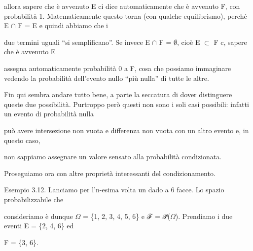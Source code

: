 \documentclass[a4paper,portrait,12pt]{article}
\begin{document}
\begin{flushleft}
allora sapere che \`{e} avvenuto E ci dice automaticamente che \`{e} avvenuto F, con probabilit\`{a} 1. Matematicamente questo torna (con qualche equilibrismo), perch\'{e} E $\cap$ F = E e quindi abbiamo che i
\end{flushleft}


\begin{flushleft}
due termini uguali {``}si semplificano''. Se invece E $\cap$ F = $\emptyset$, cio\`{e} E $\subset$ F c, sapere che \`{e} avvenuto E
\end{flushleft}


\begin{flushleft}
assegna automaticamente probabilit\`{a} 0 a F, cosa che possiamo immaginare vedendo la probabilit\`{a} dell'evento nullo {``}più nulla'' di tutte le altre.
\end{flushleft}


\begin{flushleft}
Fin qui sembra andare tutto bene, a parte la seccatura di dover distinguere queste due possibilit\`{a}. Purtroppo per\`{o} questi non sono i soli casi possibili: infatti un evento di probabilit\`{a} nulla
\end{flushleft}


\begin{flushleft}
pu\`{o} avere intersezione non vuota e differenza non vuota con un altro evento e, in questo caso,
\end{flushleft}


\begin{flushleft}
non sappiamo assegnare un valore sensato alla probabilit\`{a} condizionata.
\end{flushleft}


\begin{flushleft}
Proseguiamo ora con altre propriet\`{a} interessanti del condizionamento.
\end{flushleft}


\begin{flushleft}
Esempio 3.12. Lanciamo per l'n-esima volta un dado a 6 facce. Lo spazio probabilizzabile che
\end{flushleft}


\begin{flushleft}
consideriamo \`{e} dunque $\Omega$ = \{1, 2, 3, 4, 5, 6\} e ℱ = 𝒫($\Omega$). Prendiamo i due eventi E = \{2, 4, 6\} ed
\end{flushleft}


\begin{flushleft}
F = \{3, 6\}.
\end{flushleft}
\end{document}
